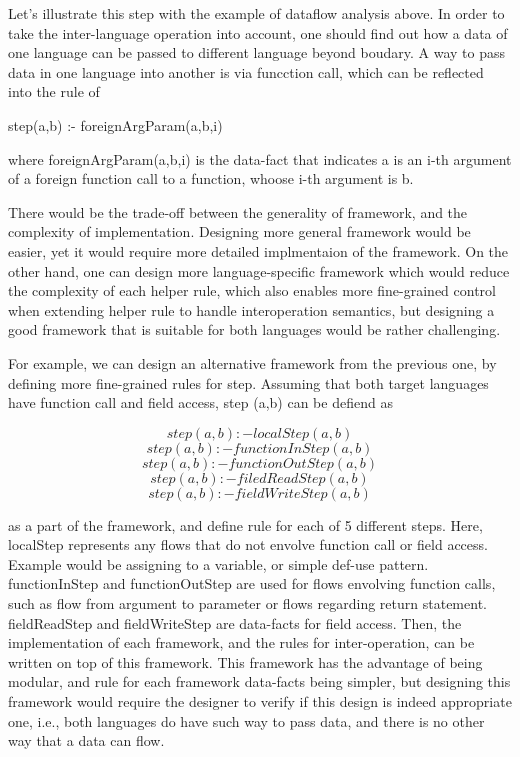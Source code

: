 Let's illustrate this step with the example of dataflow analysis above.  In
order to take the inter-language operation into account, one should find out
how a data of one language can be passed to different language beyond boudary.
A way to pass data in one language into another is via funcction call, which
can be reflected into the rule of

step(a,b) :- foreignArgParam(a,b,i)

where foreignArgParam(a,b,i) is the
data-fact that indicates a is an i-th argument of a foreign function call to a
function, whoose i-th argument is b.

There would be the trade-off between the generality of framework, and the
complexity of implementation. Designing more general framework would be easier,
yet it would require more detailed implmentaion of the framework. On the other
hand, one can design more language-specific framework which would reduce the
complexity of each helper rule, which also enables more fine-grained control
when extending helper rule to handle interoperation semantics, but designing a
good framework that is suitable for both languages would be rather challenging.

For example, we can design an alternative framework from the previous one, by
defining more fine-grained rules for step.  Assuming that both target languages
have function call and field access, step (a,b) can be defiend as

\[step(a,b) :- localStep(a, b)\]
\[step(a,b) :- functionInStep(a, b)\]
\[step(a,b) :- functionOutStep(a, b)\]
\[step(a,b) :- filedReadStep(a, b)\]
\[step(a,b) :- fieldWriteStep(a, b)\]

as a part of the framework, and define rule for each of 5 different steps.
Here, localStep represents any flows that do not envolve function call or field
access.  Example would be assigning to a variable, or simple def-use pattern.
functionInStep and functionOutStep are used for flows envolving function calls,
such as flow from argument to parameter or flows regarding return statement.
fieldReadStep and fieldWriteStep are data-facts for field access. Then, the
implementation of each framework, and the rules for inter-operation, can be
written on top of this framework. This framework has the advantage of being
modular, and rule for each framework data-facts being simpler, but designing
this framework would require the designer to verify if this design is indeed
appropriate one, i.e., both languages do have such way to pass data, and there
is no other way that a data can flow.

